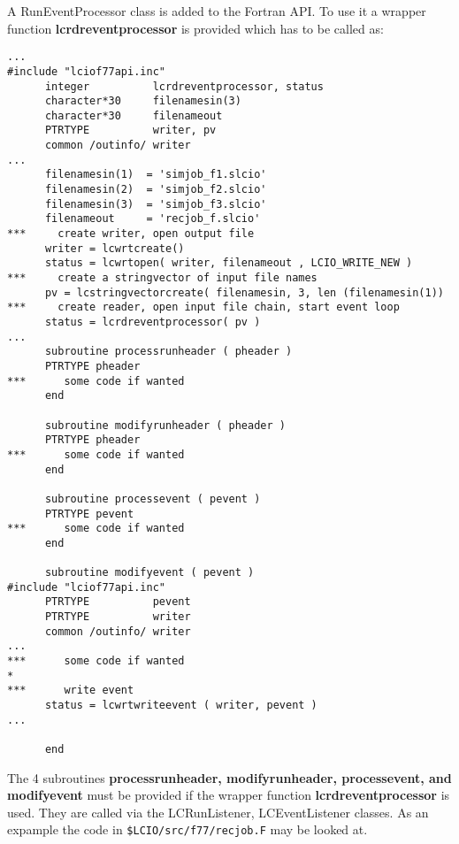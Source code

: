 A RunEventProcessor class is added to the Fortran API. To use it a wrapper function {\bf lcrdreventprocessor}
is provided which has to be called as:
\begin{verbatim}
...
#include "lciof77api.inc"
      integer          lcrdreventprocessor, status
      character*30     filenamesin(3)
      character*30     filenameout
      PTRTYPE          writer, pv
      common /outinfo/ writer
...
      filenamesin(1)  = 'simjob_f1.slcio'
      filenamesin(2)  = 'simjob_f2.slcio'
      filenamesin(3)  = 'simjob_f3.slcio'
      filenameout     = 'recjob_f.slcio'
***     create writer, open output file
      writer = lcwrtcreate()
      status = lcwrtopen( writer, filenameout , LCIO_WRITE_NEW )
***     create a stringvector of input file names
      pv = lcstringvectorcreate( filenamesin, 3, len (filenamesin(1))
***     create reader, open input file chain, start event loop
      status = lcrdreventprocessor( pv )
...
      subroutine processrunheader ( pheader )
      PTRTYPE pheader
***      some code if wanted
      end

      subroutine modifyrunheader ( pheader )
      PTRTYPE pheader
***      some code if wanted
      end

      subroutine processevent ( pevent )
      PTRTYPE pevent
***      some code if wanted
      end

      subroutine modifyevent ( pevent )
#include "lciof77api.inc"
      PTRTYPE          pevent
      PTRTYPE          writer
      common /outinfo/ writer
...
***      some code if wanted
*
***      write event
      status = lcwrtwriteevent ( writer, pevent )
...

      end
\end{verbatim}

The 4 subroutines {\bf processrunheader, modifyrunheader, processevent, and modifyevent} must be provided if
the wrapper function {\bf lcrdreventprocessor} is used. They are called via the LCRunListener, LCEventListener classes.
As an expample the code in \verb#$LCIO/src/f77/recjob.F# may be looked at.

